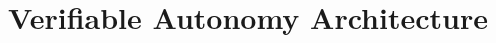 \documentclass{style/nsf}
\begin{document}

\title{Verifiable Autonomy Architecture}
%





\newpage{}
\renewcommand\refname{References Cited}


\appendix

\newpage{}


\newpage{}


%

%


%
\end{document}
